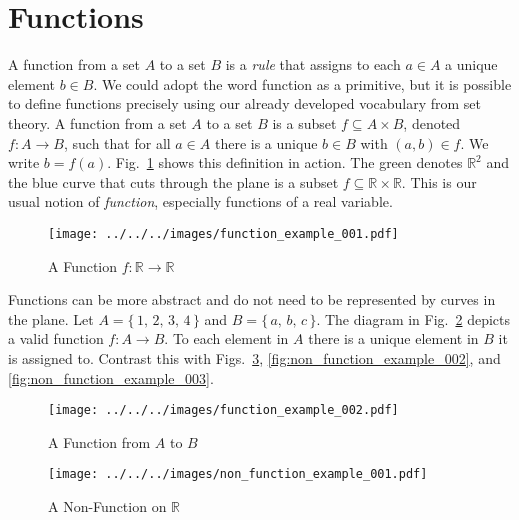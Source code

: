 \documentclass{article}
\theoremstyle{plain}
\theoremstyle{normal}
\newenvironment{definition}{%
    \pushQED{\qed}\renewcommand{\qedsymbol}{$\blacksquare$}\definitionx%
}{%
    \popQED\enddefinitionx%
}
\begin{document}
    \section{Functions}
        A function from a set $A$ to a set $B$ is a \textit{rule} that assigns
        to each $a\in{A}$ a unique element $b\in{B}$. We could adopt the word
        function as a primitive, but it is possible to define functions
        precisely using our already developed vocabulary from set theory.
        \begin{definition}[\textbf{Function}]
            A function from a set $A$ to a set $B$ is a subset
            $f\subseteq{A}\times{B}$, denoted $f:A\rightarrow{B}$, such that
            for all $a\in{A}$ there is a unique $b\in{B}$ with $(a,b)\in{f}$.
            We write $b=f(a)$.
        \end{definition}
        Fig.~\ref{fig:function_example_001} shows this definition in action.
        The green denotes $\mathbb{R}^{2}$ and the blue curve that cuts through
        the plane is a subset $f\subseteq\mathbb{R}\times\mathbb{R}$. This is
        our usual notion of \textit{function}, especially functions of a real
        variable.
        \begin{figure}
            \centering
            \texttt{[image: ../../../images/function\_example\_001.pdf]}
            \caption{A Function $f:\mathbb{R}\rightarrow\mathbb{R}$}
            \label{fig:function_example_001}
        \end{figure}
        \par\hfill\par
        Functions can be more abstract and do not need to be represented by
        curves in the plane. Let $A=\{\,1,\,2,\,3,\,4\,\}$ and
        $B=\{\,a,\,b,\,c\,\}$. The diagram in
        Fig.~\ref{fig:function_example_002} depicts a valid function
        $f:A\rightarrow{B}$. To each element in $A$ there is a unique element
        in $B$ it is assigned to. Contrast this with
        Figs.~\ref{fig:non_function_example_001},
        \ref{fig:non_function_example_002}, and \ref{fig:non_function_example_003}.
        \begin{figure}
            \centering
            \texttt{[image: ../../../images/function\_example\_002.pdf]}
            \caption{A Function from $A$ to $B$}
            \label{fig:function_example_002}
        \end{figure}
        \begin{figure}
            \centering
            \texttt{[image: ../../../images/non\_function\_example\_001.pdf]}
            \caption{A Non-Function on $\mathbb{R}$}
            \label{fig:non_function_example_001}
        \end{figure}
\end{document}
